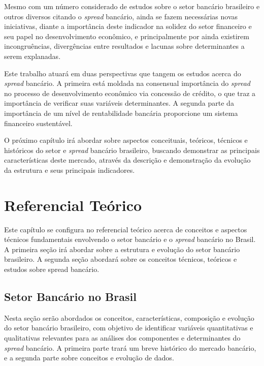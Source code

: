 \documentclass[
  12pt,
  12pt,
  openright,
  oneside,
  a4paper,
  chapter=TITLE,
  section=TITLE,
  subsection=TITLE,
  subsubsection=TITLE,
  english,
  portugues,
  sumario=tradicional]{abntex2}
\begin{document}
Mesmo com um número considerado de estudos sobre o setor bancário brasileiro e outros diversos citando o \emph{spread} bancário, ainda se fazem necessárias novas iniciativas, diante a importância deste indicador na solidez do setor financeiro e seu papel no desenvolvimento econômico, e principalmente por ainda existirem incongruências, divergências entre resultados e lacunas sobre determinantes a serem explanadas.

Este trabalho atuará em duas perspectivas que tangem os estudos acerca do \emph{spread} bancário. A primeira está moldada na consensual importância do \emph{spread} no processo de desenvolvimento econômico via concessão de crédito, o que traz a importância de verificar suas variáveis determinantes. A segunda parte da importância de um nível de rentabilidade bancária proporcione um sistema financeiro sustentável.

O próximo capítulo irá abordar sobre aspectos conceituais, teóricos, técnicos e históricos do setor e \emph{spread} bancário brasileiro, buscando demonstrar as principais características deste mercado, através da descrição e demonstração da evolução da estrutura e seus principais indicadores.

\textual
\pagestyle{simple}

\parindent 1.50cm

\chapter{Referencial Teórico}

Este capítulo se configura no referencial teórico acerca de conceitos e aspectos técnicos fundamentais envolvendo o setor bancário e o \emph{spread} bancário no Brasil. A primeira seção irá abordar sobre a estrutura e evolução do setor bancário brasileiro. A segunda seção abordará sobre os conceitos técnicos, teóricos e estudos sobre spread bancário.

\section{Setor Bancário no Brasil}

Nesta seção serão abordados os conceitos, características, composição e evolução do setor bancário brasileiro, com objetivo de identificar variáveis quantitativas e qualitativas relevantes para as análises dos componentes e determinantes do \emph{spread} bancário. A primeira parte trará um breve histórico do mercado bancário, e a segunda parte sobre conceitos e evolução de dados.
\end{document}
